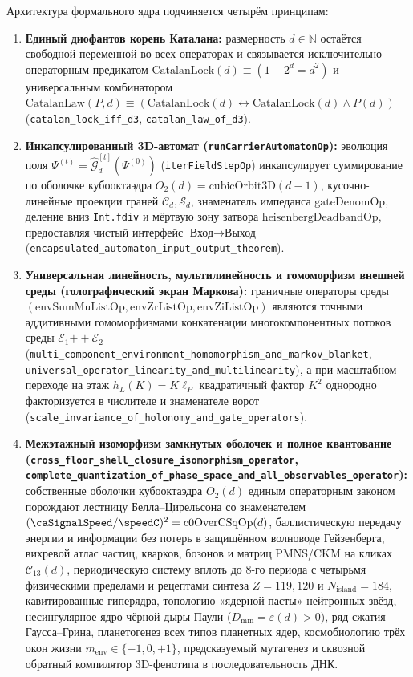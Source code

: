 Архитектура формального ядра подчиняется четырём принципам:
\begin{enumerate}[leftmargin=*,noitemsep]
\item \textbf{Единый диофантов корень Каталана:} размерность $d\in\mathbb{N}$ остаётся свободной переменной во всех операторах и связывается исключительно операторным предикатом $\mathrm{CatalanLock}(d)\equiv (1+2^d=d^2)$ и универсальным комбинатором $\mathrm{CatalanLaw}(P,d)\equiv (\mathrm{CatalanLock}(d)\leftrightarrow \mathrm{CatalanLock}(d)\wedge P(d))$ (\texttt{catalan\_lock\_iff\_d3}, \texttt{catalan\_law\_of\_d3}).
\item \textbf{Инкапсулированный 3D-автомат (\texttt{runCarrierAutomatonOp}):} эволюция поля $\Psi^{(t)} = \widehat{\mathcal{G}}_d^{[t]}(\Psi^{(0)})$ (\texttt{iterFieldStepOp}) инкапсулирует суммирование по оболочке кубооктаэдра $O_2(d)=\mathrm{cubicOrbit3D}(d-1)$, кусочно-линейные проекции граней $\mathcal{C}_d,\mathcal{S}_d$, знаменатель импеданса $\mathrm{gateDenomOp}$, деление вниз \texttt{Int.fdiv} и мёртвую зону затвора $\mathrm{heisenbergDeadbandOp}$, предоставляя чистый интерфейс $\text{Вход}\to\text{Выход}$ (\texttt{encapsulated\_automaton\_input\_output\_theorem}).
\item \textbf{Универсальная линейность, мультилинейность и гомоморфизм внешней среды (голографический экран Маркова):} граничные операторы среды $(\mathrm{envSumMuListOp},\mathrm{envZrListOp},\mathrm{envZiListOp})$ являются точными аддитивными гомоморфизмами конкатенации многокомпонентных потоков среды $\mathcal{E}_1\mathbin{++}\mathcal{E}_2$ (\texttt{multi\_component\_environment\_homomorphism\_and\_markov\_blanket}, \texttt{universal\_operator\_linearity\_and\_multilinearity}), а при масштабном переходе на этаж $h_L(K)=K\ell_P$ квадратичный фактор $K^2$ однородно факторизуется в числителе и знаменателе ворот (\texttt{scale\_invariance\_of\_holonomy\_and\_gate\_operators}).
\item \textbf{Межэтажный изоморфизм замкнутых оболочек и полное квантование (\texttt{cross\_floor\_shell\_closure\_isomorphism\_operator}, \texttt{complete\_quantization\_of\_phase\_space\_and\_all\_observables\_operator}):} собственные оболочки кубооктаэдра $O_2(d)$ единым операторным законом порождают лестницу Белла--Цирельсона со знаменателем $(\caSignalSpeed/\speedC)^2=\mathrm{c0OverCSqOp}(d)$, баллистическую передачу энергии и информации без потерь в защищённом волноводе Гейзенберга, вихревой атлас частиц, кварков, бозонов и матриц PMNS/CKM на кликах $\mathcal{C}_{13}(d)$, периодическую систему вплоть до 8-го периода с четырьмя физическими пределами и рецептами синтеза $Z=119,120$ и $N_{\mathrm{island}}=184$, кавитированные гиперядра, топологию «ядерной пасты» нейтронных звёзд, несингулярное ядро чёрной дыры Паули ($D_{\min}=\varepsilon(d)>0$), ряд сжатия Гаусса--Грина, планетогенез всех типов планетных ядер, космобиологию трёх окон жизни $m_{\mathrm{env}}\in\{-1,0,+1\}$, предсказуемый мутагенез и сквозной обратный компилятор 3D-фенотипа в последовательность ДНК.
\end{enumerate}
